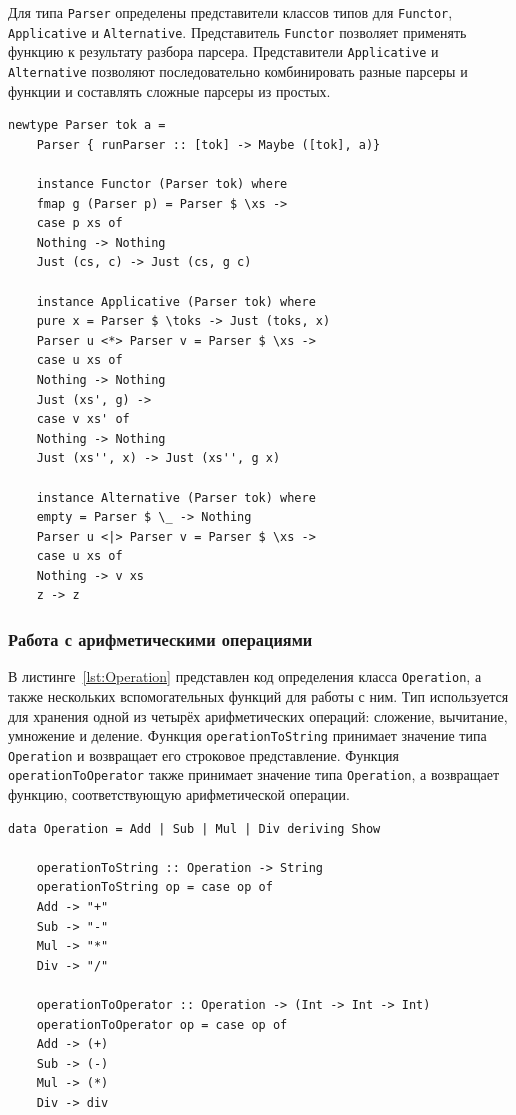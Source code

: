 \documentclass[a4paper, final]{article}
\begin{document}
Для типа \texttt{Parser} определены представители классов типов для \texttt{Functor}, \texttt{Applicative} и \texttt{Alternative}. Представитель \texttt{Functor} позволяет применять функцию к результату разбора парсера. Представители \texttt{Applicative} и \texttt{Alternative} позволяют последовательно комбинировать разные парсеры и функции и составлять сложные парсеры из простых.

\begin{lstlisting}[caption={Определение типа Parser и его представителей для классов типов Functor, Applicative и Alternative.}, label={lst:parser_type}]
	newtype Parser tok a =
	Parser { runParser :: [tok] -> Maybe ([tok], a)}
	
	instance Functor (Parser tok) where
	fmap g (Parser p) = Parser $ \xs ->
	case p xs of
	Nothing -> Nothing
	Just (cs, c) -> Just (cs, g c)
	
	instance Applicative (Parser tok) where
	pure x = Parser $ \toks -> Just (toks, x)
	Parser u <*> Parser v = Parser $ \xs ->
	case u xs of
	Nothing -> Nothing
	Just (xs', g) ->
	case v xs' of
	Nothing -> Nothing
	Just (xs'', x) -> Just (xs'', g x)
	
	instance Alternative (Parser tok) where
	empty = Parser $ \_ -> Nothing
	Parser u <|> Parser v = Parser $ \xs ->
	case u xs of
	Nothing -> v xs
	z -> z
\end{lstlisting}

\subsubsection{Работа с арифметическими операциями}
В листинге~\ref{lst:Operation} представлен код определения класса \texttt{Operation}, а также нескольких вспомогательных функций для работы с ним. Тип используется для хранения одной из четырёх арифметических операций: сложение, вычитание, умножение и деление. Функция \texttt{operationToString} принимает значение типа \texttt{Operation} и возвращает его строковое представление. Функция \texttt{operationToOperator} также принимает значение типа \texttt{Operation}, а возвращает функцию, соответствующую арифметической операции.

\begin{lstlisting}[caption={Определение типа Operation и функций для работы с ним.}, label={lst:Operation}]
	data Operation = Add | Sub | Mul | Div deriving Show
	
	operationToString :: Operation -> String
	operationToString op = case op of
	Add -> "+"
	Sub -> "-"
	Mul -> "*"
	Div -> "/" 
	
	operationToOperator :: Operation -> (Int -> Int -> Int)
	operationToOperator op = case op of
	Add -> (+)
	Sub -> (-)
	Mul -> (*)
	Div -> div 
\end{lstlisting}
\end{document}
